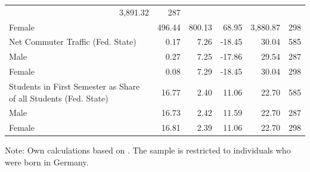 \documentclass[a4paper, oneside, hyperfootnotes = false]{article}
\begin{document}
{\begin{table}[ht]
\begin{center}
{\begin{tabular}{llllll}
			\multicolumn{1}{r}{3,891.32} &
			\multicolumn{1}{r}{287} \\
			\multicolumn{1}{l}{\hspace{1em}Female} &
			\multicolumn{1}{r}{496.44} &
			\multicolumn{1}{r}{800.13} &
			\multicolumn{1}{r}{68.95} &
			\multicolumn{1}{r}{3,880.87} &
			\multicolumn{1}{r}{298} \\
			\multicolumn{1}{l}{Net Commuter Traffic (Fed. State)} &
			\multicolumn{1}{r}{0.17} &
			\multicolumn{1}{r}{7.26} &
			\multicolumn{1}{r}{-18.45} &
			\multicolumn{1}{r}{30.04} &
			\multicolumn{1}{r}{585} \\
			\multicolumn{1}{l}{\hspace{1em}Male} &
			\multicolumn{1}{r}{0.27} &
			\multicolumn{1}{r}{7.25} &
			\multicolumn{1}{r}{-17.86} &
			\multicolumn{1}{r}{29.54} &
			\multicolumn{1}{r}{287} \\
			\multicolumn{1}{l}{\hspace{1em}Female} &
			\multicolumn{1}{r}{0.08} &
			\multicolumn{1}{r}{7.29} &
			\multicolumn{1}{r}{-18.45} &
			\multicolumn{1}{r}{30.04} &
			\multicolumn{1}{r}{298} \\
			\multicolumn{1}{l}{Students in First Semester as Share of all Students (Fed. State)} &
			\multicolumn{1}{r}{16.77} &
			\multicolumn{1}{r}{2.40} &
			\multicolumn{1}{r}{11.06} &
			\multicolumn{1}{r}{22.70} &
			\multicolumn{1}{r}{585} \\
			\multicolumn{1}{l}{\hspace{1em}Male} &
			\multicolumn{1}{r}{16.73} &
			\multicolumn{1}{r}{2.42} &
			\multicolumn{1}{r}{11.59} &
			\multicolumn{1}{r}{22.70} &
			\multicolumn{1}{r}{287} \\
			\multicolumn{1}{l}{\hspace{1em}Female} &
			\multicolumn{1}{r}{16.81} &
			\multicolumn{1}{r}{2.39} &
			\multicolumn{1}{r}{11.06} &
			\multicolumn{1}{r}{22.70} &
			\multicolumn{1}{r}{298} \\
			\bottomrule
	\end{tabular}}

	\vspace{2mm}
	
	\parbox{15cm}{
		\linespread{1}\footnotesize Note: Own calculations based on \cite{SOEP2023}. The sample is restricted to individuals who were born in Germany.}
	
\end{center}
\end{table}

\clearpage

}
\end{document}
